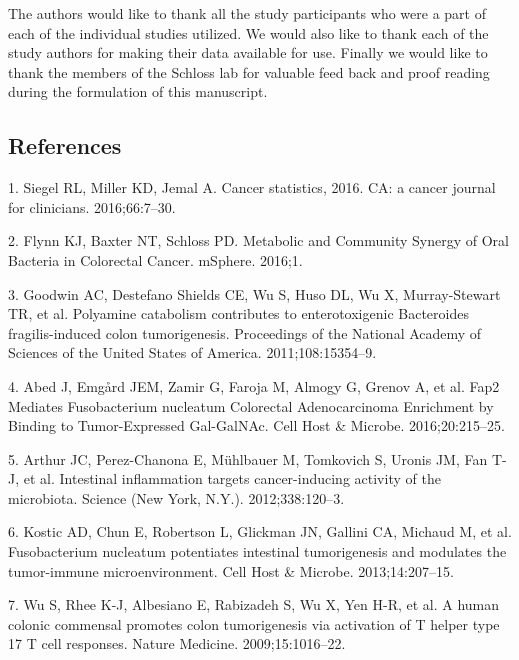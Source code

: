 \documentclass[12pt,]{article}
\begin{document}
The authors would like to thank all the study participants who were a
part of each of the individual studies utilized. We would also like to
thank each of the study authors for making their data available for use.
Finally we would like to thank the members of the Schloss lab for
valuable feed back and proof reading during the formulation of this
manuscript.

\newpage

\subsection{References}\label{references}

\hypertarget{refs}{}
\hypertarget{ref-siegel_cancer_2016}{}
1. Siegel RL, Miller KD, Jemal A. Cancer statistics, 2016. CA: a cancer
journal for clinicians. 2016;66:7--30.

\hypertarget{ref-flynn_metabolic_2016}{}
2. Flynn KJ, Baxter NT, Schloss PD. Metabolic and Community Synergy of
Oral Bacteria in Colorectal Cancer. mSphere. 2016;1.

\hypertarget{ref-goodwin_polyamine_2011}{}
3. Goodwin AC, Destefano Shields CE, Wu S, Huso DL, Wu X, Murray-Stewart
TR, et al. Polyamine catabolism contributes to enterotoxigenic
Bacteroides fragilis-induced colon tumorigenesis. Proceedings of the
National Academy of Sciences of the United States of America.
2011;108:15354--9.

\hypertarget{ref-abed_fap2_2016}{}
4. Abed J, Emgård JEM, Zamir G, Faroja M, Almogy G, Grenov A, et al.
Fap2 Mediates Fusobacterium nucleatum Colorectal Adenocarcinoma
Enrichment by Binding to Tumor-Expressed Gal-GalNAc. Cell Host \&
Microbe. 2016;20:215--25.

\hypertarget{ref-arthur_intestinal_2012}{}
5. Arthur JC, Perez-Chanona E, Mühlbauer M, Tomkovich S, Uronis JM, Fan
T-J, et al. Intestinal inflammation targets cancer-inducing activity of
the microbiota. Science (New York, N.Y.). 2012;338:120--3.

\hypertarget{ref-kostic_fusobacterium_2013}{}
6. Kostic AD, Chun E, Robertson L, Glickman JN, Gallini CA, Michaud M,
et al. Fusobacterium nucleatum potentiates intestinal tumorigenesis and
modulates the tumor-immune microenvironment. Cell Host \& Microbe.
2013;14:207--15.

\hypertarget{ref-wu_human_2009}{}
7. Wu S, Rhee K-J, Albesiano E, Rabizadeh S, Wu X, Yen H-R, et al. A
human colonic commensal promotes colon tumorigenesis via activation of T
helper type 17 T cell responses. Nature Medicine. 2009;15:1016--22.
\end{document}
